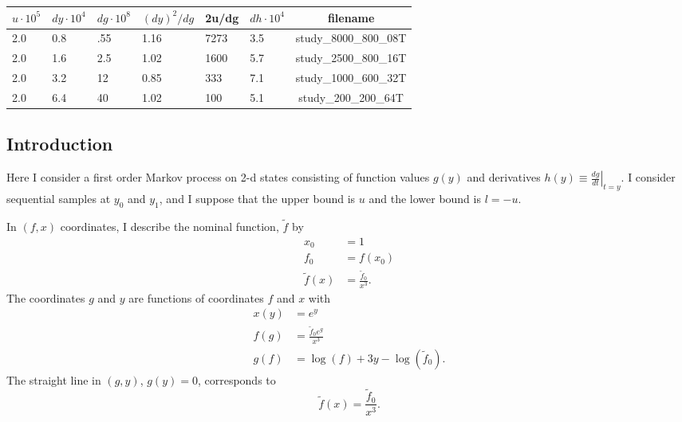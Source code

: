 \documentclass[]{article}
\begin{document}
\begin{tabular}{|l|l|l|l|l|l|c|}
  \hline
  $u\cdot 10^5$ & $dy\cdot 10^4$ & $dg\cdot 10^8$ & $(dy)^2/dg$
  & 2u/dg &$dh\cdot 10^4$ & filename \\
  \hline
  2.0 & 0.8 & .55 & 1.16 &7273& 3.5  & study\_8000\_800\_08T \\
  2.0 & 1.6 & 2.5 & 1.02 &1600& 5.7  & study\_2500\_800\_16T \\
  2.0 & 3.2 & 12  & 0.85 &333 & 7.1  & study\_1000\_600\_32T \\ %
  2.0 & 6.4 & 40  & 1.02 &100 & 5.1  & study\_200\_200\_64T \\
  \hline
\end{tabular}

\subsection{Introduction}
  \label{sec:introduction}

Here I consider a first order Markov process on 2-d states consisting
of function values $g(y)$ and derivatives $h(y) \equiv \left. \frac{d
    g }{d t} \right|_{t=y}$.  I consider sequential samples at $y_0$
and $y_1$, and I suppose that the upper bound is $u$ and the lower
bound is $l=-u$.

In $(f,x)$ coordinates, I describe the nominal function, $\tilde f$ by
\begin{align*}
  x_0 &= 1\\
  f_0 &= f(x_0) \\
  \tilde f(x) &= \frac{\tilde f_0}{x^3}.
\end{align*}
The coordinates $g$ and $y$ are functions of coordinates $f$ and $x$ with
\begin{align*}
  x(y) &= e^y \\
  f(g) &= \frac{\tilde f_0 e^{g}}{x^3} \\
  g(f) &= \log(f) + 3y - \log(\tilde f_0).
\end{align*}
The straight line in $(g,y)$, $g(y) = 0$, corresponds to
\begin{equation*}
  \tilde f(x) = \frac{\tilde f_0}{x^3}.
\end{equation*}
\end{document}
